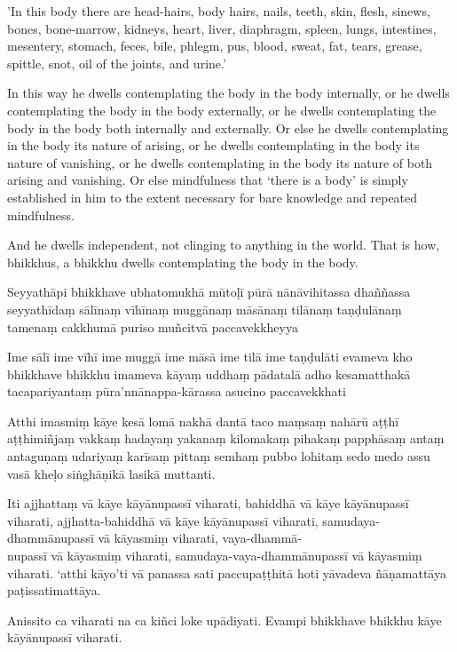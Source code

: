 'In this body there are head-hairs, body hairs, nails, teeth, skin, flesh,
sinews, bones, bone-marrow, kidneys, heart, liver, diaphragm, spleen, lungs,
intestines, mesentery, stomach, feces, bile, phlegm, pus, blood, sweat, fat,
tears, grease, spittle, snot, oil of the joints, and urine.'

In this way he dwells contemplating the body in the body internally, or he
dwells contemplating the body in the body externally, or he dwells contemplating
the body in the body both internally and externally. Or else he dwells
contemplating in the body its nature of arising, or he dwells contemplating in
the body its nature of vanishing, or he dwells contemplating in the body its
nature of both arising and vanishing. Or else mindfulness that ‘there is a body’
is simply established in him to the extent necessary for bare knowledge and
repeated mindfulness.

And he dwells independent, not clinging to anything in the world. That is how,
bhikkhus, a bhikkhu dwells contemplating the body in the body.


\paliPage

Seyyathāpi bhikkhave ubhatomukhā mūtoḷī pūrā nānāvihitassa dhaññassa seyyathīdaṃ
sālīnaṃ vīhīnaṃ muggānaṃ māsānaṃ tilānaṃ taṇḍulānaṃ tamenaṃ cakkhumā puriso
muñcitvā paccavekkheyya

Ime sālī ime vīhī ime muggā ime māsā ime tilā ime taṇḍulāti evameva kho
bhikkhave bhikkhu imameva kāyaṃ uddhaṃ pādatalā adho kesamatthakā tacapariyantaṃ
pūra'nnānappa-kārassa asucino paccavekkhati

Atthi imasmiṃ kāye kesā lomā nakhā dantā taco maṃsaṃ nahārū aṭṭhī aṭṭhimiñjaṃ
vakkaṃ hadayaṃ yakanaṃ kilomakaṃ pihakaṃ papphāsaṃ antaṃ antaguṇaṃ udariyaṃ
karīsaṃ pittaṃ semhaṃ pubbo lohitaṃ sedo medo assu vasā kheḷo siṅghāṇikā lasikā
muttanti.

Iti ajjhattaṃ vā kāye kāyānupassī viharati, bahiddhā vā kāye kāyānupassī
viharati, ajjhatta-bahiddhā vā kāye kāyānupassī viharati, samudaya-dhammānupassī
vā kāyasmiṃ viharati, vaya-dhammā-\\
nupassī vā kāyasmiṃ viharati, samudaya-vaya-dhammānupassī vā kāyasmiṃ viharati.
`atthi kāyo'ti vā panassa sati paccupaṭṭhitā hoti yāvadeva ñāṇamattāya
paṭissatimattāya.

Anissito ca viharati na ca kiñci loke upādiyati. Evampi bhikkhave bhikkhu kāye
kāyānupassī viharati.

